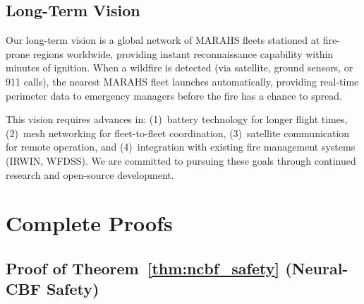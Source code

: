 \documentclass[12pt,a4paper]{article}
\begin{document}
\subsection{Long-Term Vision}

Our long-term vision is a global network of MARAHS fleets stationed at fire-prone regions worldwide, providing instant reconnaissance capability within minutes of ignition. When a wildfire is detected (via satellite, ground sensors, or 911 calls), the nearest MARAHS fleet launches automatically, providing real-time perimeter data to emergency managers before the fire has a chance to spread.

This vision requires advances in: (1)~battery technology for longer flight times, (2)~mesh networking for fleet-to-fleet coordination, (3)~satellite communication for remote operation, and (4)~integration with existing fire management systems (IRWIN, WFDSS). We are committed to pursuing these goals through continued research and open-source development.


\newpage




\newpage
\appendix
\renewcommand{\thesection}{\Alph{section}}

\section{Complete Proofs}
\label{app:proofs}

\subsection{Proof of Theorem~\ref{thm:ncbf_safety} (Neural-CBF Safety)}
\end{document}
